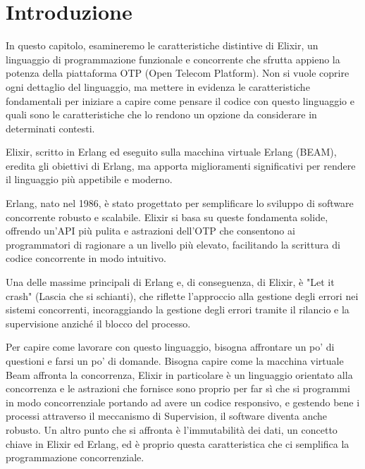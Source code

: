 \section{Introduzione}



In questo capitolo, esamineremo le caratteristiche distintive
di Elixir, un linguaggio di programmazione funzionale e
concorrente che sfrutta appieno la potenza della piattaforma
OTP (Open Telecom Platform). Non si vuole coprire ogni dettaglio
del linguaggio, ma mettere in evidenza le caratteristiche
fondamentali per iniziare a capire come pensare il codice
con questo linguaggio e quali sono le caratteristiche che
lo rendono un opzione da considerare in determinati contesti.

Elixir, scritto in Erlang ed eseguito sulla macchina virtuale
Erlang (BEAM), eredita gli obiettivi di Erlang, ma apporta
miglioramenti significativi per rendere il linguaggio più
appetibile e moderno.

Erlang, nato nel 1986, è stato progettato per semplificare
lo sviluppo di software concorrente robusto e scalabile.
Elixir si basa su queste fondamenta solide, offrendo un'API
più pulita e astrazioni dell'OTP che consentono ai programmatori
di ragionare a un livello più elevato, facilitando la scrittura
di codice concorrente in modo intuitivo.

Una delle massime principali di Erlang e, di conseguenza,
di Elixir, è "Let it crash" (Lascia che si schianti),
che riflette l'approccio alla gestione degli errori nei sistemi
concorrenti, incoraggiando la gestione degli errori tramite
il rilancio e la supervisione anziché il blocco del processo.

Per capire come lavorare con questo linguaggio, bisogna affrontare
un po' di questioni e farsi un po' di domande.
Bisogna capire come la macchina virtuale Beam affronta la concorrenza,
Elixir in particolare è un linguaggio orientato alla concorrenza e 
le astrazioni che fornisce sono proprio per far sì che
si programmi in modo concorrenziale portando ad avere un
codice responsivo, e gestendo bene i processi attraverso 
il meccanismo di Supervision, il software diventa anche robusto.
Un altro punto che si affronta è l'immutabilità dei dati, un concetto
chiave in Elixir ed Erlang, ed è proprio questa caratteristica
che ci semplifica la programmazione concorrenziale.
